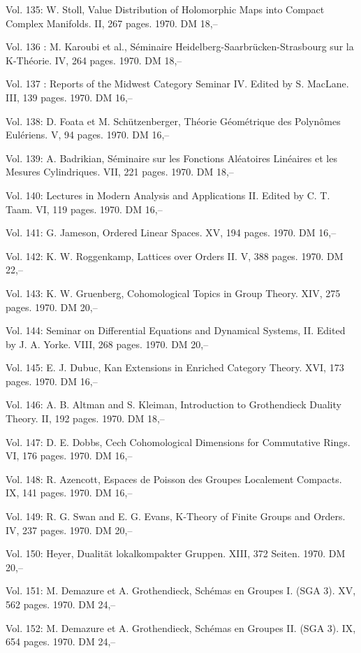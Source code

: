 Vol. 135: W. Stoll, Value Distribution of Holomorphic Maps into Compact Complex Manifolds. II, 267 pages. 1970. DM 18,--

Vol. 136 : M. Karoubi et al., Séminaire Heidelberg-Saarbrücken-Strasbourg sur la K-Théorie. IV, 264 pages. 1970. DM 18,--

Vol. 137 : Reports of the Midwest Category Seminar IV. Edited by S. MacLane. III, 139 pages. 1970. DM 16,--

Vol. 138: D. Foata et M. Schützenberger, Théorie Géométrique des Polynômes Eulériens. V, 94 pages. 1970. DM 16,--

Vol. 139: A. Badrikian, Séminaire sur les Fonctions Aléatoires Linéaires et les Mesures Cylindriques. VII, 221 pages. 1970. DM 18,--

Vol. 140: Lectures in Modern Analysis and Applications II. Edited by C. T. Taam. VI, 119 pages. 1970. DM 16,--

Vol. 141: G. Jameson, Ordered Linear Spaces. XV, 194 pages. 1970. DM 16,--

Vol. 142: K. W. Roggenkamp, Lattices over Orders II. V, 388 pages. 1970. DM 22,--

Vol. 143: K. W. Gruenberg, Cohomological Topics in Group Theory. XIV, 275 pages. 1970. DM 20,--

Vol. 144: Seminar on Differential Equations and Dynamical Systems, II. Edited by J. A. Yorke. VIII, 268 pages. 1970. DM 20,--

Vol. 145: E. J. Dubuc, Kan Extensions in Enriched Category Theory. XVI, 173 pages. 1970. DM 16,--

Vol. 146: A. B. Altman and S. Kleiman, Introduction to Grothendieck Duality Theory. II, 192 pages. 1970. DM 18,--

Vol. 147: D. E. Dobbs, Cech Cohomological Dimensions for Commutative Rings. VI, 176 pages. 1970. DM 16,--

Vol. 148: R. Azencott, Espaces de Poisson des Groupes Localement Compacts. IX, 141 pages. 1970. DM 16,--

Vol. 149: R. G. Swan and E. G. Evans, K-Theory of Finite Groups and Orders. IV, 237 pages. 1970. DM 20,--

Vol. 150: Heyer, Dualität lokalkompakter Gruppen. XIII, 372 Seiten. 1970. DM 20,--

Vol. 151: M. Demazure et A. Grothendieck, Schémas en Groupes I. (SGA 3). XV, 562 pages. 1970. DM 24,--

Vol. 152: M. Demazure et A. Grothendieck, Schémas en Groupes II. (SGA 3). IX, 654 pages. 1970. DM 24,--

